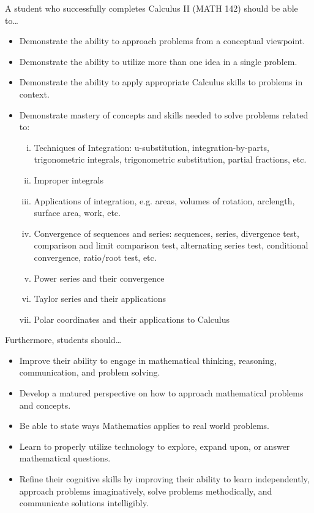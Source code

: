 \documentclass[11pt,letterpaper]{article}
\begin{document}

A student who successfully completes Calculus II (MATH 142) should be able to\dots
	\begin{itemize} \itemsep=0.3ex
	\item Demonstrate the ability to approach problems from a conceptual viewpoint.
	\item Demonstrate the ability to utilize more than one idea in a single problem.
	\item Demonstrate the ability to apply appropriate Calculus skills to problems in context.
	\item Demonstrate mastery of concepts and skills needed to solve problems related to:
		\begin{enumerate}[(i)]
		\item Techniques of Integration: u-substitution, integration-by-parts, trigonometric integrals, trigonometric substitution, partial fractions, etc.
		\item Improper integrals
		\item Applications of integration, e.g. areas, volumes of rotation, arclength, surface area, work, etc.
		\item Convergence of sequences and series: sequences, series, divergence test, comparison and limit comparison test, alternating series test, conditional convergence, ratio/root test, etc.
		\item Power series and their convergence
		\item Taylor series and their applications
		\item Polar coordinates and their applications to Calculus
		\end{enumerate}
	\end{itemize}
Furthermore, students should\dots
	\begin{itemize} \itemsep=0.3ex
	\item  Improve their ability to engage in mathematical thinking, reasoning, communication, and problem solving.
	\item Develop a matured perspective on how to approach mathematical problems and concepts.
	\item Be able to state ways Mathematics applies to real world problems.
	\item Learn to properly utilize technology to explore, expand upon, or answer mathematical questions.
	\item Refine their cognitive skills by improving their ability to learn independently, approach problems imaginatively, solve problems methodically, and communicate solutions intelligibly.
	\end{itemize}
\sectionbreak
\end{document}
